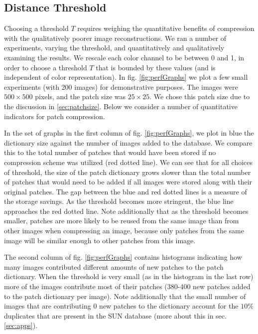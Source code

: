 \subsection{Distance Threshold}

Choosing a threshold $T$ requires weighing the quantitative benefits of compression with the qualitatively poorer image reconstructions. We ran a number of experiments, varying the threshold, and quantitatively and qualitatively examining the results. We rescale each color channel to be between 0 and 1, in order to choose a threshold $T$ that is bounded by these values (and is independent of color representation). In fig. \ref{fig:perfGraphs} we plot a few small experiments (with 200 images) for demonstrative purposes. The images were $500\times 500$ pixels, and the patch size was $25\times 25$. We chose this patch size due to the discussion in \ref{sec:patchsize}. Below we consider a number of quantitative indicators for patch compression.

In the set of graphs in the first column of fig. \ref{fig:perfGraphs}, we plot in blue the dictionary size against the number of images added to the database. We compare this to the total number of patches that would have been stored if no compression scheme was utilized (red dotted line). We can see that for all choices of threshold, the size of the patch dictionary grows slower than the total number of patches that would need to be added if all images were stored along with their original patches. The gap between the blue and red dotted lines is a measure of the storage savings. As the threshold becomes more stringent, the blue line approaches the red dotted line. Note additionally that as the threshold becomes smaller, patches are more likely to be reused from the same image than from other images when compressing an image, because only patches from the same image will be similar enough to other patches from this image.

The second column of fig. \ref{fig:perfGraphs} contains histograms indicating how many images contributed different amounts of new patches to the patch dictionary. When the threshold is very small (as in the histogram in the last row) more of the images contribute most of their patches (380-400 new patches added to the patch dictionary per image). Note additionally that the small number of images that are contributing 0 new patches to the dictionary account for the $10\%$ duplicates that are present in the SUN database (more about this in sec. \ref{sec:apps}).

